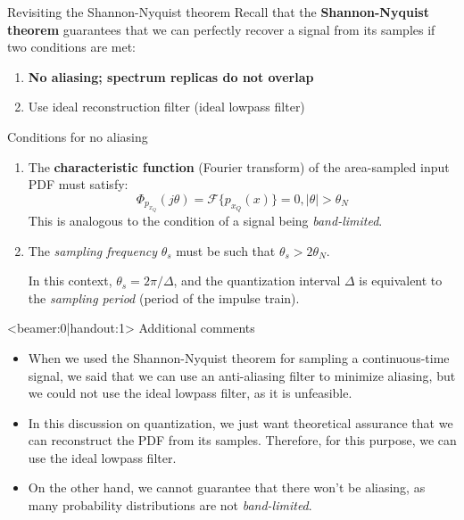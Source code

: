 %
\begin{frame}{Revisiting the Shannon-Nyquist theorem}
	Recall that the \textbf{Shannon-Nyquist theorem} guarantees that we can perfectly recover a signal from its samples if two conditions are met:
	\begin{enumerate}
		\item \textbf{No aliasing; spectrum replicas do not overlap}
		\item Use ideal reconstruction filter (ideal lowpass filter)
	\end{enumerate}
	\pause
	\begin{block}{Conditions for no aliasing}
		\begin{enumerate}
			\item The \textbf{characteristic function} (Fourier transform) of the area-sampled input PDF must satisfy: 
			\begin{equation*}
				\Phi_{p_{x_Q}}(j\theta) = \mathcal{F}\{p_{x_Q}(x)\} = 0, |\theta| > \theta_N
			\end{equation*}
			This is analogous to the condition of a signal being \textit{band-limited}.
			\item\pause The \textit{sampling frequency} $\theta_s$ must be such that $\theta_s > 2\theta_N$.
			
			In this context, $\theta_s = 2\pi/\Delta$, and the quantization interval $\Delta$ is equivalent to the \textit{sampling period} (period of the impulse train).
		\end{enumerate}
	\end{block}
\end{frame}

%
\begin{frame}<beamer:0|handout:1>
Additional comments
\begin{itemize}
	\item When we used the Shannon-Nyquist theorem for sampling a continuous-time signal, we said that we can use an anti-aliasing filter to minimize aliasing, but we could not use the ideal lowpass filter, as it is unfeasible.
	\item In this discussion on quantization, we just want theoretical assurance that we can reconstruct the PDF from its samples. Therefore, for this purpose, we can use the ideal lowpass filter.
	\item On the other hand, we cannot guarantee that there won't be aliasing, as many probability distributions are not \textit{band-limited}.
\end{itemize}
\end{frame}

